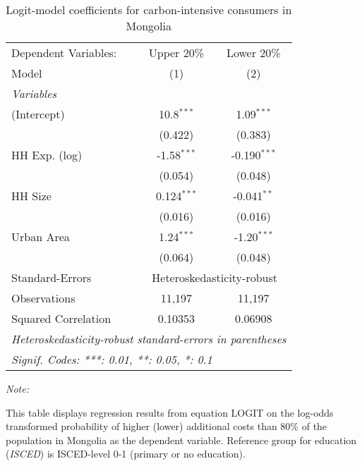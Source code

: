 
\begin{table}[htbp!]
   \centering
   \small
   \begin{adjustbox}{width = 1\textwidth, max height = 0.95\textheight, center}
      \begin{threeparttable}[b]
         \caption{\label{tab:Logit_1_MNG} Logit-model coefficients for carbon-intensive consumers in Mongolia}
         \begin{tabular}{lcc}
            \tabularnewline \midrule \midrule
            Dependent Variables: & Upper 20\%    & Lower 20\%\\   
            Model                & (1)           & (2)\\  
            \midrule
            \emph{Variables}\\
            (Intercept)          & 10.8$^{***}$  & 1.09$^{***}$\\   
                                 & (0.422)       & (0.383)\\   
            HH Exp. (log)        & -1.58$^{***}$ & -0.190$^{***}$\\   
                                 & (0.054)       & (0.048)\\   
            HH Size              & 0.124$^{***}$ & -0.041$^{**}$\\   
                                 & (0.016)       & (0.016)\\   
            Urban Area           & 1.24$^{***}$  & -1.20$^{***}$\\   
                                 & (0.064)       & (0.048)\\   
            \midrule 
            Standard-Errors & \multicolumn{2}{c}{Heteroskedasticity-robust} \\ 
            Observations         & 11,197        & 11,197\\  
            Squared Correlation  & 0.10353       & 0.06908\\  
            \midrule \midrule
            \multicolumn{3}{l}{\emph{Heteroskedasticity-robust standard-errors in parentheses}}\\
            \multicolumn{3}{l}{\emph{Signif. Codes: ***: 0.01, **: 0.05, *: 0.1}}\\
         \end{tabular}
         
         \begin{tablenotes}\item \medskip \textit{Note:}
            \item This table displays regression results from equation LOGIT on the log-odds transformed probability of higher (lower) additional costs than 80\% of the population in Mongolia as the dependent variable. Reference group for education (\textit{ISCED}) is ISCED-level 0-1 (primary or no education).
         \end{tablenotes}
      \end{threeparttable}
   \end{adjustbox}
\end{table}


